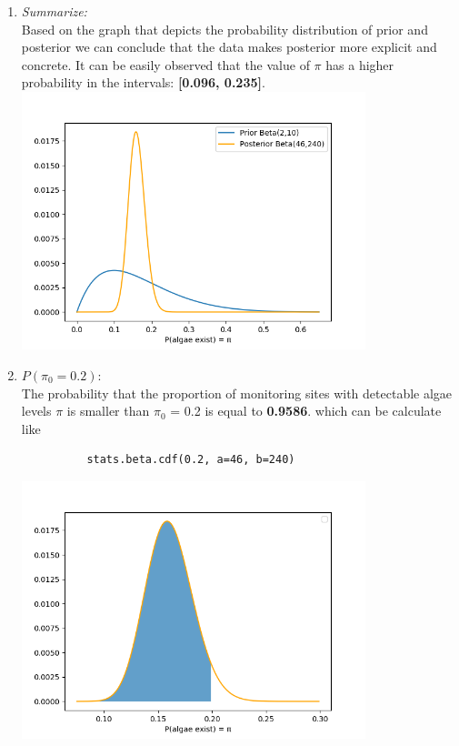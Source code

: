 \documentclass[11pt,a4paper,english]{article}
\begin{document}
    \begin{enumerate}[label=\alph*.]
      \item \textit{Summarize:}\\
        Based on the graph that depicts the probability distribution of prior
        and posterior we can conclude that the data makes posterior more
        explicit and concrete.
        It can be easily observed that the value of $\pi$ has a higher probability
        in the intervals: \textbf{[0.096, 0.235]}.
        \includegraphics[width=10cm]{prob_distribution.png}

      \item \begin{math} P(\pi_0 = 0.2): \end{math}\\
        The probability that the proportion of monitoring sites with detectable
        algae levels $\pi$ is smaller than $\pi_0$ = 0.2 is equal to \textbf{0.9586}.
        which can be calculate like
        \begin{verbatim}
          stats.beta.cdf(0.2, a=46, b=240)
        \end{verbatim}
        \includegraphics[width=10cm]{cumulative.png}


\end{enumerate}
\end{document}
